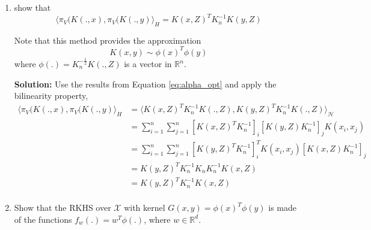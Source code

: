 \documentclass{article}[12pt]
\begin{document}
\begin{enumerate}
\item show that 
\begin{equation}
 \langle \pi_V(K(.,x),\pi_V(K(.,y) \rangle_H = K(x,Z)^T K_n^{-1} K(y,Z)
 \end{equation}
 
 Note that this method provides the approximation 
 \begin{equation}
K(x,y) \sim \phi(x)^T \phi(y) 
\end{equation}  
 where $\phi(.)=K_n^{-\frac{1}{2}}K(.,Z)$ is a vector in $\mathbb{R}^n$.

 \textbf{Solution:} Use the results from Equation \ref{eq:alpha_opt} and apply the bilinearity property,
 \begin{equation}
	 \begin{aligned}
		 \langle \pi_V(K(.,x),\pi_V(K(.,y) \rangle_H &= \langle K(x, Z)^T K_n^{-1} K(., Z), K(y, Z)^T K_n^{-1} K(., Z) \rangle_{\mathcal H}\\
							     &= \sum^{n}_{i=1} \sum^{n}_{j=1} \left[ K(x, Z)^T K_n^{-1} \right]_i \left[ K(y, Z) K_n^{-1} \right]_j K(x_i, x_j) \\
							     &= \sum^{n}_{i=1} \sum^{n}_{j=1} \left[ K(y, Z)^T K_n^{-1} \right]_i^T K(x_i, x_j) \left[ K(x, Z) K_n^{-1} \right]_j \\
							     &= K(y, Z)^T K_n^{-1} K_n K_n^{-1} K(x, Z) \\
							     &= K(y, Z)^T K_n^{-1} K(x, Z) \\
	 \end{aligned}
 \end{equation}
 

\item Show that the RKHS over $\mathcal{X}$ with kernel $G(x,y)=\phi(x)^T\phi(y)$ is made of the functions $f_w(.)=w^T\phi(.)$, where $w \in \mathbb{R}^d$.


\end{enumerate}
\end{document}

